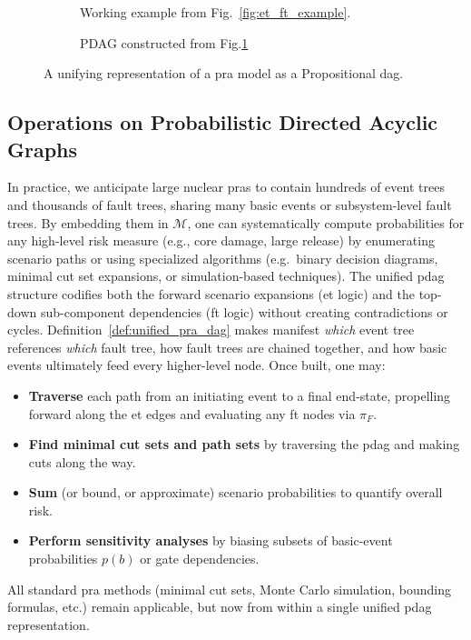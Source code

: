 \begin{figure}
    \centering
    \begin{subfigure}{0.35\textwidth}
        \centering
        
    \caption{Working example from Fig.~\ref{fig:et_ft_example}.}
        \label{fig:recall_ef_ft_example}
    \end{subfigure}
    \hfill
    \begin{subfigure}{0.60\textwidth}
        \centering
        
        \caption{PDAG constructed from Fig.\ref{fig:recall_ef_ft_example}}
        \label{fig:pdag_pass_1}
    \end{subfigure}
    \caption{A unifying representation of a \acrfull{pra} model as a Propositional \acrfull{dag}.}
\end{figure}

\subsection{Operations on Probabilistic Directed Acyclic Graphs}
In practice, we anticipate large nuclear \acrshort{pra}s to contain hundreds of event trees and thousands of fault trees, sharing many basic events or subsystem-level fault trees.  By embedding them in \(\mathcal{M}\), one can systematically compute probabilities for any high-level risk measure (e.g., core damage, large release) by enumerating scenario paths or using specialized algorithms (e.g.\ binary decision diagrams, minimal cut set expansions, or simulation-based techniques).  The unified \acrshort{pdag} structure codifies both the forward scenario expansions (\acrshort{et} logic) and the top-down sub-component dependencies (\acrshort{ft} logic) without creating contradictions or cycles. Definition~\ref{def:unified_pra_dag} makes manifest \emph{which} event tree references \emph{which} fault tree, how fault trees are chained together, and how basic events ultimately feed every higher-level node.  Once built, one may:
\begin{itemize}
\item \textbf{Traverse} each path from an initiating event to a final end-state, propelling forward along the \acrshort{et} edges and evaluating any \acrshort{ft} nodes via \(\pi_{F}\).
\item \textbf{Find minimal cut sets and path sets} by traversing the \acrshort{pdag} and making cuts along the way.
\item \textbf{Sum} (or bound, or approximate) scenario probabilities to quantify overall risk.  
\item \textbf{Perform sensitivity analyses} by biasing subsets of basic-event probabilities \(p(b)\) or gate dependencies.
\end{itemize}
All standard \acrshort{pra} methods (minimal cut sets, Monte Carlo simulation, bounding formulas, etc.) remain applicable, but now from within a single unified \acrshort{pdag} representation.